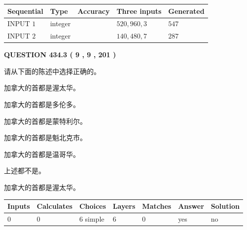 \documentclass{ctexart}
\begin{document}
   
  
  
\noindent\begin{tabular}{|l|l|l|l|l|}
\hline
 Sequential & Type & Accuracy & Three inputs & Generated \\ 
\hline
 
 
  INPUT $  1 $ & integer &  & $
 520
 , 
 960
 , 
 3
 $ & $ 547 $ 
 \\  \hline  
 
 
  INPUT $  2 $ & integer &  & $
 140
 , 
 480
 , 
 7
 $ & $ 287 $ 
 \\  \hline  
 \end{tabular}
   
   
  
\vspace{0.2in}
  
{\textbf{\Large{QUESTION
434.3 
 ( 9 , 9 , 201 )
}}}
  
  
请从下面的陈述中选择正确的。
 
 
加拿大的首都是渥太华。
 
 
加拿大的首都是多伦多。
 
 
加拿大的首都是蒙特利尔。
 
 
加拿大的首都是魁北克市。
 
 
加拿大的首都是温哥华。
 
 
 上述都不是。
 
 
\noindent{}
 
 
加拿大的首都是渥太华。
 
 
\noindent{}
 
 
   
   
   
   
\noindent\begin{tabular}{|l|l|l|l|l|l|l|}
 \hline
Inputs & Calculates & Choices & Layers & Matches & Answer & Solution \\ \hline
 0  & 
 0  & 
 6
  simple  
  & 
 6  & 
 0  & 
  yes & 
  no 
  \\ \hline
 \end{tabular}
   
   
   
   
\noindent{}
   
\end{document}
